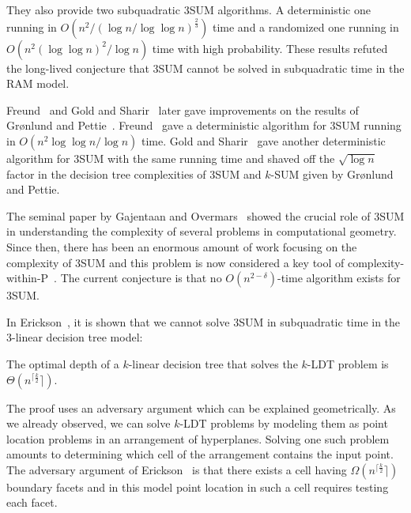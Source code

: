 They also provide two subquadratic 3SUM
algorithms. A deterministic one running in
$O(n^2/{(\log n/\log \log n)}^{\frac{2}{3}})$
time and a randomized one running in
$O(n^2 {(\log \log n)}^2 / \log n)$ time with high probability.
These results refuted the long-lived conjecture that
3SUM cannot be solved in subquadratic time in the RAM model.

Freund~\cite{Fr15} and Gold and Sharir~\cite{GS15} later gave improvements on the
results of Gr{\o}nlund and Pettie~\cite{GP18}. Freund~\cite{Fr15} gave a deterministic algorithm for
3SUM running in \(O( {n^2\log \log n}/{\log n})\) time.
Gold and Sharir~\cite{GS15} gave another deterministic algorithm for 3SUM
with the same running time and shaved off the $\sqrt{\log n}$ factor in the
decision tree complexities of 3SUM and \(k\)-SUM given by Gr{\o}nlund and Pettie.


The seminal paper by Gajentaan and Overmars~\cite{GO95} showed the crucial role
of 3SUM in understanding the complexity of several problems in
computational geometry.
Since then, there has been an enormous amount of work focusing on the complexity of
3SUM and this problem is now considered a key tool of
complexity-within-P~\cite{GO95,BH99,MO01,BDP08,P10,ACLL14,AVW14,GP18,KPP14,ALW14,AWY15,CL15}.
The current conjecture is that no $O(n^{2-\delta})$-time algorithm exists for 3SUM.

In Erickson~\cite{Er99a}, it is shown that we cannot solve 3SUM in
subquadratic time in the \(3\)-linear decision tree model:
\begin{theorem}
The optimal depth of a \(k\)-linear decision tree that solves
the \(k\)-LDT problem is $\Theta(n^{\lceil\frac{k}{2}}\rceil)$.
\end{theorem}
The proof uses an adversary argument which can be explained geometrically. As
we already observed, we can solve \(k\)-LDT problems by modeling them as point
location problems in an arrangement of hyperplanes. Solving one such problem
amounts to determining which cell of the arrangement contains the input point.
The adversary argument of Erickson~\cite{Er99a} is that there exists a cell having
$\Omega(n^{\lceil\frac{k}{2}}\rceil)$ boundary facets and in this model point
location in such a cell requires testing each facet.
